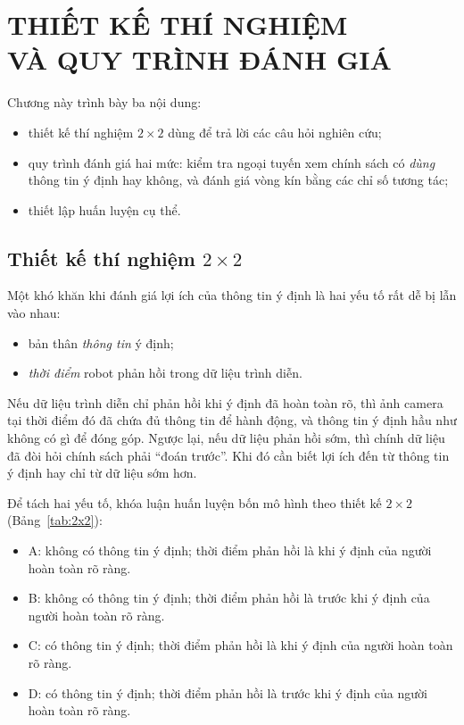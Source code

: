\chapter[THIẾT KẾ THÍ NGHIỆM VÀ QUY TRÌNH ĐÁNH GIÁ]{THIẾT KẾ THÍ NGHIỆM\\VÀ QUY TRÌNH ĐÁNH GIÁ}
\label{chap:experiments}

Chương này trình bày ba nội dung:
\begin{itemize}
  \item thiết kế thí nghiệm $2\times2$ dùng để trả lời các câu hỏi nghiên cứu;
  \item quy trình đánh giá hai mức: kiểm tra ngoại tuyến xem chính sách có \emph{dùng} thông tin ý định hay không, và đánh giá vòng kín bằng các chỉ số tương tác;
  \item thiết lập huấn luyện cụ thể.
\end{itemize}

\section{Thiết kế thí nghiệm \texorpdfstring{$2\times2$}{2×2}}
\label{sec:design-2x2}

Một khó khăn khi đánh giá lợi ích của thông tin ý định là hai yếu tố rất dễ bị lẫn vào nhau:
\begin{itemize}
  \item bản thân \emph{thông tin} ý định;
  \item \emph{thời điểm} robot phản hồi trong dữ liệu trình diễn.
\end{itemize}
Nếu dữ liệu trình diễn chỉ phản hồi khi ý định đã hoàn toàn rõ, thì ảnh camera tại thời điểm đó đã chứa đủ thông tin để hành động, và thông tin ý định hầu như không có gì để đóng góp. Ngược lại, nếu dữ liệu phản hồi sớm, thì chính dữ liệu đã đòi hỏi chính sách phải ``đoán trước''. Khi đó cần biết lợi ích đến từ thông tin ý định hay chỉ từ dữ liệu sớm hơn.

Để tách hai yếu tố, khóa luận huấn luyện bốn mô hình theo thiết kế $2\times2$ (Bảng~\ref{tab:2x2}):
\begin{itemize}
  \item A: không có thông tin ý định; thời điểm phản hồi là khi ý định của người hoàn toàn rõ ràng.
  \item B: không có thông tin ý định; thời điểm phản hồi là trước khi ý định của người hoàn toàn rõ ràng.
  \item C: có thông tin ý định; thời điểm phản hồi là khi ý định của người hoàn toàn rõ ràng.
  \item D: có thông tin ý định; thời điểm phản hồi là trước khi ý định của người hoàn toàn rõ ràng.
\end{itemize}

